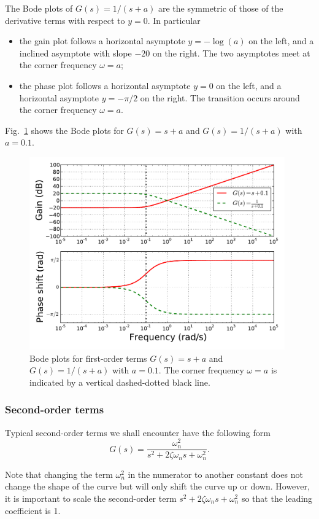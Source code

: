 \documentclass[a4paper,11pt]{report}
\theoremstyle{definition}
\begin{document}
The Bode plots of $G(s)=1/(s+a)$ are the symmetric of those of the
derivative terms with respect to $y=0$. In particular
\begin{itemize}
\item the gain plot follows a horizontal asymptote $y=-\log(a)$ on the
  left, and a inclined asymptote with slope $-20$ on the right. The
  two asymptotes meet at the corner frequency $\omega=a$;
\item the phase plot follows a horizontal asymptote $y=0$ on the left,
  and a horizontal asymptote $y=-\pi/2$ on the right. The transition
  occurs around the corner frequency $\omega=a$.
\end{itemize}

Fig.~\ref{fig:bode-1st} shows the Bode plots for $G(s) = s+a$ and
$G(s)=1/(s+a)$ with $a=0.1$.

\begin{figure}[H]
  \centering
  \includegraphics[width=11cm]{fig/bode-first.pdf}
  \caption{Bode plots for first-order terms $G(s) = s+a$ and
    $G(s)=1/(s+a)$ with $a=0.1$. The corner frequency $\omega=a$ is
    indicated by a vertical dashed-dotted black line.}
  \label{fig:bode-1st}
\end{figure}


\subsubsection{Second-order terms}

Typical second-order terms we shall encounter have the following form  
\[
G(s) = \frac{\omega_n^2}{s^2+2\zeta\omega_ns+\omega_n^2}.
\]

Note that changing the term $\omega_n^2$ in the numerator to another
constant does not change the shape of the curve but will only shift
the curve up or down. However, it is important to scale the
second-order term $s^2+2\zeta\omega_ns+\omega_n^2$ so that the leading
coefficient is 1.
\end{document}
